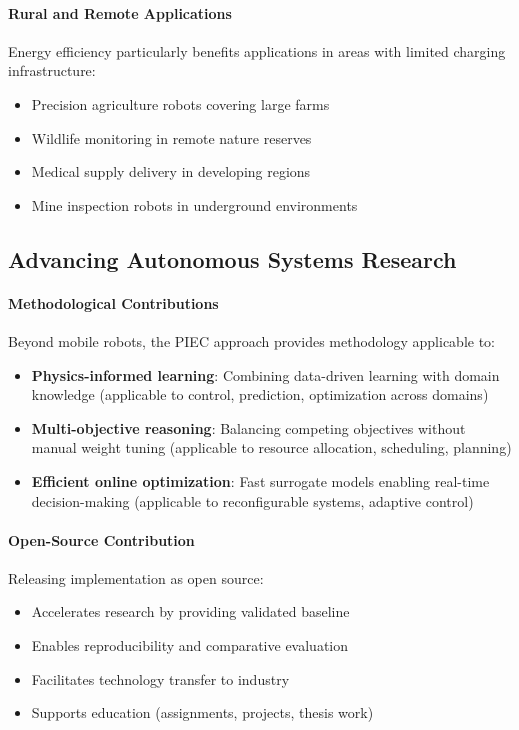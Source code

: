 \paragraph{Rural and Remote Applications}
Energy efficiency particularly benefits applications in areas with limited charging infrastructure:
\begin{itemize}
    \item Precision agriculture robots covering large farms
    \item Wildlife monitoring in remote nature reserves
    \item Medical supply delivery in developing regions
    \item Mine inspection robots in underground environments
\end{itemize}

\subsection{Advancing Autonomous Systems Research}

\paragraph{Methodological Contributions}
Beyond mobile robots, the PIEC approach provides methodology applicable to:
\begin{itemize}
    \item \textbf{Physics-informed learning}: Combining data-driven learning with domain knowledge (applicable to control, prediction, optimization across domains)
    \item \textbf{Multi-objective reasoning}: Balancing competing objectives without manual weight tuning (applicable to resource allocation, scheduling, planning)
    \item \textbf{Efficient online optimization}: Fast surrogate models enabling real-time decision-making (applicable to reconfigurable systems, adaptive control)
\end{itemize}

\paragraph{Open-Source Contribution}
Releasing implementation as open source:
\begin{itemize}
    \item Accelerates research by providing validated baseline
    \item Enables reproducibility and comparative evaluation
    \item Facilitates technology transfer to industry
    \item Supports education (assignments, projects, thesis work)
\end{itemize}

